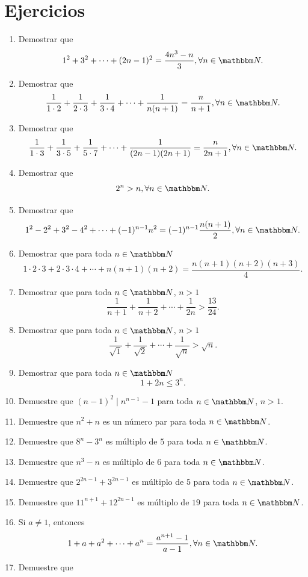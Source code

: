 \newpage

\section{Ejercicios}

\begin{enumerate}
    \item Demostrar que
    $$1^2+3^2+\cdots +(2n-1)^2=\frac{4n^3-n}{3}, \forall n \in \NN.$$
    \item Demostrar que
    $$\frac{1}{1\cdot 2}+\frac{1}{2\cdot 3}+\frac{1}{3\cdot 4}+\cdots +\frac{1}{n(n+1)}=\frac{n}{n+1}, \forall n \in \NN.$$
    \item Demostrar que
    $$\frac{1}{1\cdot 3}+\frac{1}{3\cdot 5}+\frac{1}{5\cdot 7}+\cdots +\frac{1}{(2n-1)(2n+1)}=\frac{n}{2n+1}, \forall n \in \NN.$$
    \item Demostrar que
    $$2^n>n, \forall n \in \NN.$$
    \item Demostrar que
    $$1^2-2^2+3^2-4^2+\cdots +(-1)^{n-1}n^2=(-1)^{n-1} \frac{n(n+1)}{2}, \forall n \in \NN.$$
    \item Demostrar que para toda $n \in \NN$
    $$1 \cdot 2 \cdot 3 + 2\cdot 3 \cdot 4 + \cdots + n(n+1)(n+2) = \frac{n(n+1)(n+2)(n+3)}{4}.$$
    \item Demostrar que para toda $n \in \NN$, $n>1$
    $$\frac{1}{n+1}+\frac{1}{n+2}+\cdots +\frac{1}{2n}>\frac{13}{24}.$$
    \item Demostrar que para toda $n \in \NN$, $n>1$
    $$\frac{1}{\sqrt{1}}+\frac{1}{\sqrt{2}}+\cdots +\frac{1}{\sqrt{n}}>\sqrt{n}.$$
    \item Demostrar que para toda $n \in \NN$
    $$1+2n \leq 3^n.$$
    \item Demuestre que $(n-1)^2 \mid n^{n-1}-1$ para toda $n \in \NN$, $n>1$.
    \item Demuestre que $n^2+n$ es un número par para toda $n \in \NN$.
    \item Demuestre que $8^n-3^n$ es múltiplo de $5$ para toda $n \in \NN$.
    \item Demuestre que $n^3-n$ es múltiplo de $6$ para toda $n \in \NN$.
    \item Demuestre que $2^{2n-1}+3^{2n-1}$ es múltiplo de $5$ para toda $n \in \NN$.
    \item Demuestre que $11^{n+1}+12^{2n-1}$ es múltiplo de $19$ para toda $n \in \NN$.
    \item Si $a \neq 1$, entonces
    $$1+a+a^2+\cdots +a^n=\frac{a^{n+1}-1}{a-1}, \forall n \in \NN.$$
    \item Demuestre que

\end{enumerate}
